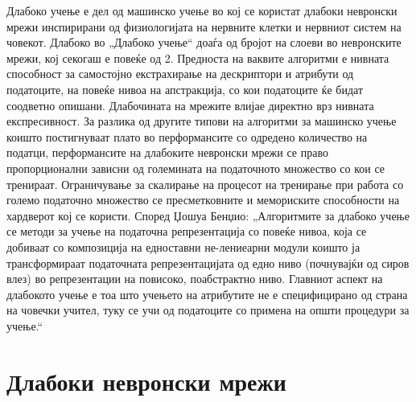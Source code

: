 Длабоко учење е дел од машинско учење во кој се користат длабоки невронски мрежи инспирирани од физиологијата на нервните клетки и нервниот систем на човекот. Длабоко во „Длабоко учење“ доаѓа од бројот на слоеви во невронските мрежи, кој секогаш е повеќе од 2. Предноста на ваквите алгоритми е нивната способност за самостојно екстрахирање на дескриптори и атрибути од податоците, на повеќе нивоа на апстракција, со кои податоците ќе бидат соодветно опишани. Длабочината на мрежите влијае директно врз нивната експресивност. За разлика од другите типови на алгоритми за машинско учење коишто постигнуваат плато во перформансите со одредено количество на податци, перформансите на длабоките невронски мрежи се право пропорционални зависни од големината на податочното множество со кои се тренираат. Ограничување за скалирање на процесот на тренирање при работа со големо податочно множество се пресметковните и мемориските способности на хардверот кој се користи.
Според Џошуа Бенџио: „Алгоритмите за длабоко учење се методи за учење на податочна репрезентација со повеќе нивоа, која се добиваат со композиција на едноставни не-лениеарни модули коишто ја трансформираат податочната репрезентацијата од едно ниво (почнувајќи од сиров влез) во репрезентации на повисоко, поабстрактно ниво. Главниот аспект на длабокото учење е тоа што учењето на атрибутите не е специфицирано од страна на човечки учител, туку се учи од податоците со примена на општи процедури за учење.“
 
\section{Длабоки невронски мрежи}

